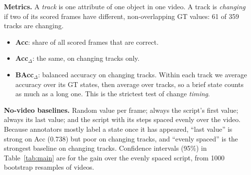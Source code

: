 \documentclass[10pt]{article}
\begin{document}
\textbf{Metrics.} A \emph{track} is one attribute of one object in one video. A track is \emph{changing} if two of its scored frames have different, non-overlapping GT values: 61 of 359 tracks are changing.
\begin{itemize}
\item \textbf{Acc}: share of all scored frames that are correct.
\item \textbf{Acc$_\Delta$}: the same, on changing tracks only.
\item \textbf{BAcc$_\Delta$}: balanced accuracy on changing tracks. Within each track we average accuracy over its GT states, then average over tracks, so a brief state counts as much as a long one. This is the strictest test of change \emph{timing}.
\end{itemize}
\textbf{No-video baselines.} Random value per frame; always the script's first value; always its last value; and the script with its steps spaced evenly over the video. Because annotators mostly label a state once it has appeared, ``last value'' is strong on Acc (0.738) but poor on changing tracks, and ``evenly spaced'' is the strongest baseline on changing tracks. Confidence intervals (95\%) in Table~\ref{tab:main} are for the gain over the evenly spaced script, from 1000 bootstrap resamples of videos.
\end{document}
